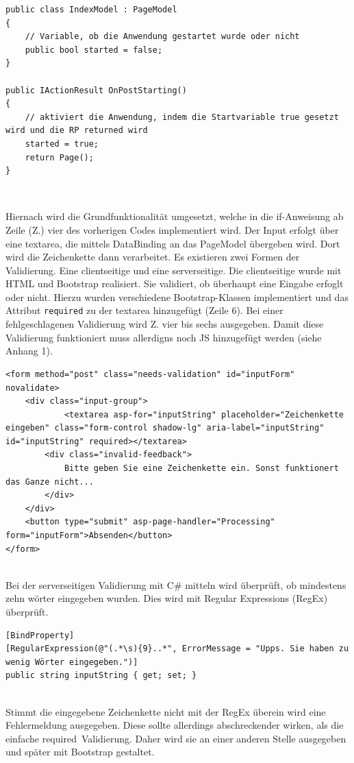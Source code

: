 \documentclass[a4paper,
12pt,
oneside]
{article}
\newcommand{\sPar}{\par\vspace*{6pt}}
\begin{document}
	\lstset{style=csharp}
	\begin{lstlisting}
public class IndexModel : PageModel
{
	// Variable, ob die Anwendung gestartet wurde oder nicht
	public bool started = false;
}

public IActionResult OnPostStarting()
{
	// aktiviert die Anwendung, indem die Startvariable true gesetzt wird und die RP returned wird
	started = true;
	return Page();
}
	\end{lstlisting} ~\sPar
	Hiernach wird die Grundfunktionalität umgesetzt, welche in die if-Anweisung ab Zeile (Z.) vier des vorherigen Codes implementiert wird. Der Input erfolgt über eine textarea, die mittels DataBinding an das PageModel übergeben wird. Dort wird die Zeichenkette dann verarbeitet. Es existieren zwei Formen der Validierung. Eine clientseitige und eine serverseitige. Die clientseitige wurde mit HTML und Bootstrap realisiert. Sie validiert, ob überhaupt eine Eingabe erfoglt oder nicht. Hierzu wurden verschiedene Bootstrap-Klassen implementiert und das Attribut \texttt{required} zu der textarea hinzugefügt (Zeile 6). Bei einer fehlgeschlagenen Validierung wird Z. vier bis sechs ausgegeben. Damit diese Validierung funktioniert muss allerdigns noch JS hinzugefügt werden (siehe Anhang 1).
	\lstset{style=csharp}
	\begin{lstlisting}
<form method="post" class="needs-validation" id="inputForm" novalidate>
	<div class="input-group">
			<textarea asp-for="inputString" placeholder="Zeichenkette eingeben" class="form-control shadow-lg" aria-label="inputString" id="inputString" required></textarea>
		<div class="invalid-feedback">
			Bitte geben Sie eine Zeichenkette ein. Sonst funktionert das Ganze nicht...
		</div>
	</div>
	<button type="submit" asp-page-handler="Processing" form="inputForm">Absenden</button>
</form>
	\end{lstlisting} ~\\
	Bei der serverseitigen Validierung mit C\# mitteln wird überprüft, ob mindestens zehn wörter eingegeben wurden. Dies wird mit Regular Expressions (RegEx) überprüft. 
	\lstset{style=csharp}
	\begin{lstlisting}
[BindProperty]
[RegularExpression(@"(.*\s){9}..*", ErrorMessage = "Upps. Sie haben zu wenig Wörter eingegeben.")]
public string inputString { get; set; }
	\end{lstlisting} ~\\
	Stimmt die eingegebene Zeichenkette nicht mit der RegEx überein wird eine Fehlermeldung ausgegeben. Diese sollte allerdings abschreckender wirken, als die einfache \glqq required\grqq~Validierung. Daher wird sie an einer anderen Stelle ausgegeben und später mit Bootstrap gestaltet.
\end{document}
